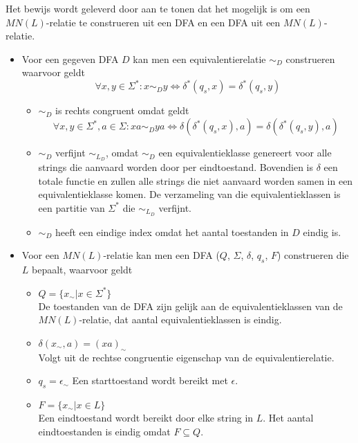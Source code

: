   Het bewijs wordt geleverd door aan te tonen dat het mogelijk is om een $MN(L)$-relatie te construeren uit een DFA en een DFA uit een $MN(L)$-relatie.
  \begin{itemize}
  \item Voor een gegeven DFA $D$ kan men een equivalentierelatie $\sim_D$ construeren waarvoor geldt
  \begin{equation*}
  \forall x, y \in \Sigma^*: x \sim_D y \Leftrightarrow \delta^*(q_s, x) = \delta^*(q_s, y)
  \end{equation*}
  \begin{itemize}
  \item $\sim_D$ is rechts congruent omdat geldt
  \begin{equation*}
  \forall x, y \in \Sigma^*, a \in \Sigma: xa \sim_D ya \Leftrightarrow \delta(\delta^*(q_s, x), a) = \delta(\delta^*(q_s, y), a)
  \end{equation*}
  \item $\sim_D$ verfijnt $\sim_{L_D}$, omdat $\sim_D$ een equivalentieklasse genereert voor alle strings die aanvaard worden door per eindtoestand. Bovendien is $\delta$ een totale functie en zullen alle strings die niet aanvaard worden samen in een equivalentieklasse komen. De verzameling van die equivalentieklassen is een partitie van $\Sigma^*$ die $\sim_{L_D}$ verfijnt.
  \item $\sim_D$ heeft een eindige index omdat het aantal toestanden in $D$ eindig is.
  \end{itemize}
  \item Voor een $MN(L)$-relatie kan men een DFA ($Q$, $\Sigma$, $\delta$, $q_s$, $F$) construeren die $L$ bepaalt, waarvoor geldt
  \begin{itemize}
  \item $Q = \{x_\sim|x \in \Sigma^*\}$\\
  De toestanden van de DFA zijn gelijk aan de equivalentieklassen van de $MN(L)$-relatie, dat aantal equivalentieklassen is eindig.
  \item $\delta(x_\sim, a) = (xa)_\sim$\\
  Volgt uit de rechtse congruentie eigenschap van de equivalentierelatie.
  \item $q_s = \epsilon_\sim$
  Een starttoestand wordt bereikt met $\epsilon$.
  \item $F = \{x_\sim|x \in L\}$\\
  Een eindtoestand wordt bereikt door elke string in $L$. Het aantal eindtoestanden is eindig omdat $F \subseteq Q$.
  \end{itemize}

\end{itemize}
